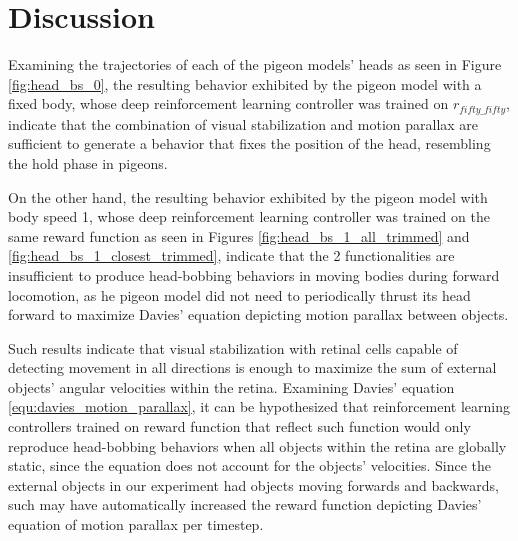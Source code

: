 \chapter{Discussion} \label{ch:discussion}
  Examining the trajectories of each of the pigeon models' heads as seen in Figure \ref{fig:head_bs_0}, the resulting behavior exhibited by the pigeon model with a fixed body, whose deep reinforcement learning controller was trained on $r_{fifty\_fifty}$, indicate that the combination of visual stabilization and motion parallax are sufficient to generate a behavior that fixes the position of the head, resembling the hold phase in pigeons.

  On the other hand, the resulting behavior exhibited by the pigeon model with body speed 1, whose deep reinforcement learning controller was trained on the same reward function as seen in Figures \ref{fig:head_bs_1_all_trimmed} and \ref{fig:head_bs_1_closest_trimmed}, indicate that the 2 functionalities are insufficient to produce head-bobbing behaviors in moving bodies during forward locomotion, as he pigeon model did not need to periodically thrust its head forward to maximize Davies' equation depicting motion parallax between objects.

  Such results indicate that visual stabilization with retinal cells capable of detecting movement in all directions is enough to maximize the sum of external objects' angular velocities within the retina.
    Examining Davies' equation \ref{equ:davies_motion_parallax}, it can be hypothesized that reinforcement learning controllers trained on reward function that reflect such function would only reproduce head-bobbing behaviors when all objects within the retina are globally static, since the equation does not account for the objects' velocities.
    Since the external objects in our experiment had objects moving forwards and backwards, such may have automatically increased the reward function depicting Davies' equation of motion parallax per timestep.



